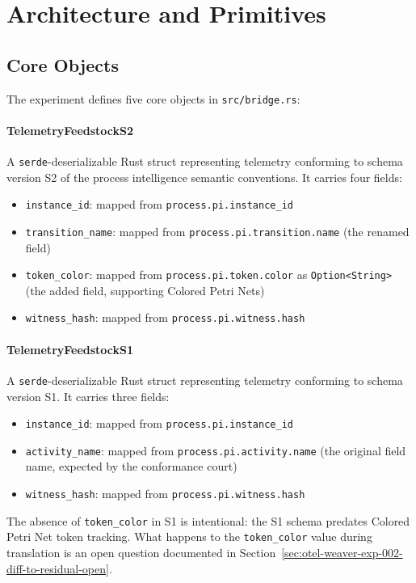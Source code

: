
\section{Architecture and Primitives}
\label{sec:otel-weaver-exp-002-diff-to-residual-arch}

\subsection{Core Objects}
\label{sec:otel-weaver-exp-002-diff-to-residual-arch-objects}

The experiment defines five core objects in \texttt{src/bridge.rs}:

\paragraph{TelemetryFeedstockS2}
A \texttt{serde}-deserializable Rust struct representing telemetry conforming to
schema version S2 of the process intelligence semantic conventions. It carries four
fields:
\begin{itemize}
    \item \texttt{instance\_id}: mapped from \texttt{process.pi.instance\_id}
    \item \texttt{transition\_name}: mapped from \texttt{process.pi.transition.name}
          (the renamed field)
    \item \texttt{token\_color}: mapped from \texttt{process.pi.token.color} as
          \texttt{Option<String>} (the added field, supporting Colored Petri Nets)
    \item \texttt{witness\_hash}: mapped from \texttt{process.pi.witness.hash}
\end{itemize}

\paragraph{TelemetryFeedstockS1}
A \texttt{serde}-deserializable Rust struct representing telemetry conforming to
schema version S1. It carries three fields:
\begin{itemize}
    \item \texttt{instance\_id}: mapped from \texttt{process.pi.instance\_id}
    \item \texttt{activity\_name}: mapped from \texttt{process.pi.activity.name}
          (the original field name, expected by the conformance court)
    \item \texttt{witness\_hash}: mapped from \texttt{process.pi.witness.hash}
\end{itemize}
The absence of \texttt{token\_color} in S1 is intentional: the S1 schema predates
Colored Petri Net token tracking. What happens to the \texttt{token\_color} value
during translation is an open question documented in
Section~\ref{sec:otel-weaver-exp-002-diff-to-residual-open}.

